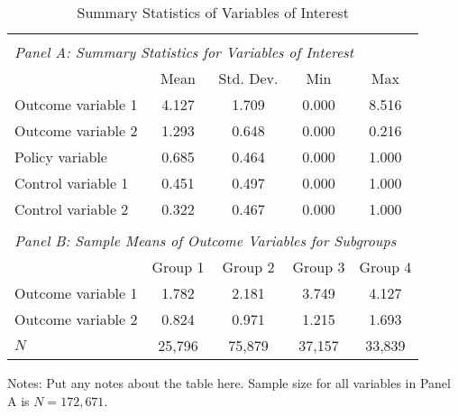\documentclass[12pt,english]{article}
\begin{document}
\begin{table}[ht]
\caption{Summary Statistics of Variables of Interest}
\label{tab:descriptives} 
\centering
\begin{threeparttable}
\begin{tabular}{lcccc}
&&&&\\
\multicolumn{5}{l}{\emph{Panel A: Summary Statistics for Variables of Interest}}\\
\toprule
                                                        & Mean  & Std. Dev. & Min   & Max   \\
\midrule
Outcome variable 1                                      & 4.127 & 1.709     & 0.000 & 8.516 \\
Outcome variable 2                                      & 1.293 & 0.648     & 0.000 & 0.216 \\
Policy variable                                         & 0.685 & 0.464     & 0.000 & 1.000 \\
Control variable 1                                      & 0.451 & 0.497     & 0.000 & 1.000 \\
Control variable 2                                      & 0.322 & 0.467     & 0.000 & 1.000 \\
&&&&\\
\multicolumn{5}{l}{\emph{Panel B: Sample Means of Outcome Variables for Subgroups}}\\
\midrule
                                                        & Group 1 & Group 2 & Group 3 & Group 4 \\
\midrule
Outcome variable 1                                      & 1.782  & 2.181  & 3.749  & 4.127  \\
Outcome variable 2                                      & 0.824  & 0.971  & 1.215  & 1.693  \\
\midrule
$N$                                                     & 25,796 & 75,879 & 37,157 & 33,839 \\
\bottomrule
\end{tabular}
\footnotesize Notes: Put any notes about the table here. Sample size for all variables in Panel A is $N=172,671$.
\end{threeparttable}
\end{table}


\end{document}

